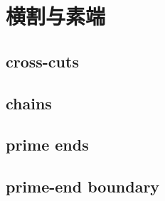 \section{横割与素端}
\label{b3:sec:0701}


\subsection{cross-cuts}
\label{b3:subsec:070101}

\subsection{chains}
\label{b3:subsec:070102}

\subsection{prime ends}
\label{b3:subsec:070103}

\subsection{prime-end boundary}
\label{b3:subsec:070104}


